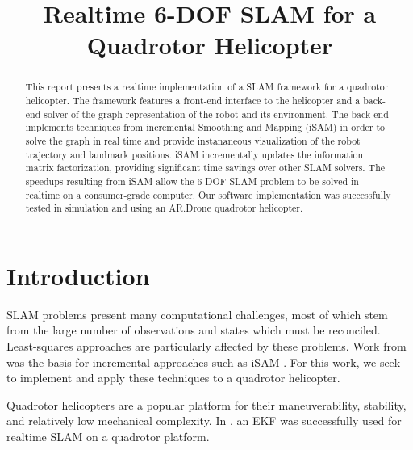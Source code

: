 \documentclass[conference]{IEEEtran}
\title{Realtime 6-DOF SLAM for a Quadrotor Helicopter}
\author{\IEEEauthorblockN{Stephen Chaves}
  \and
  \IEEEauthorblockN{Schuyler Cohen}
  \and
  \IEEEauthorblockN{Patrick O'Keefe}
  \and
  \IEEEauthorblockN{Paul Ozog}}
\begin{document}
\maketitle



\begin{abstract}

  This report presents a realtime implementation of a \ac{SLAM} framework for a quadrotor
  helicopter.  The framework features a front-end interface to the helicopter and a
  back-end solver of the graph representation of the robot and its environment. The
  back-end implements techniques from incremental Smoothing and Mapping (iSAM) in order to
  solve the graph in real time and provide instananeous visualization of the robot
  trajectory and landmark positions. iSAM incrementally updates the information matrix
  factorization, providing significant time savings over other \ac{SLAM} solvers. The speedups
  resulting from iSAM allow the 6-\ac{DOF} \ac{SLAM} problem to be solved in realtime on a
  consumer-grade computer. Our software implementation was successfully tested in simulation
  and using an AR.Drone quadrotor helicopter.

\end{abstract}






\section{Introduction}
\label{sec:introduction}




\ac{SLAM} problems present many computational challenges, most of which stem from the
large number of observations and states which must be reconciled. Least-squares approaches
are particularly affected by these problems. Work from \cite{dellaert2005square} was the
basis for incremental approaches such as iSAM \cite{Kaess08tro}. For this work, we seek to
implement and apply these techniques to a quadrotor helicopter.


Quadrotor helicopters are a popular platform for their maneuverability, stability, and
relatively low mechanical complexity. In \cite{whateverthis}, an \ac{EKF} was successfully
used for realtime \ac{SLAM} on a quadrotor platform. 
\end{document}
